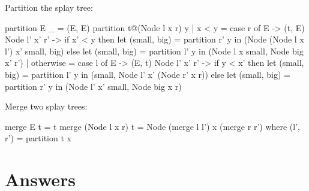 \documentclass[b5paper]{article}
\begin{document}
Partition the splay tree:

\begin{Haskell}
partition E _ = (E, E)
partition t@(Node l x r) y
    | x < y =
        case r of
          E -> (t, E)
          Node l' x' r' ->
              if x' < y then
                  let (small, big) = partition r' y in
                  (Node (Node l x l') x' small, big)
              else
                  let (small, big) = partition l' y in
                  (Node l x small, Node big x' r')
    | otherwise =
        case l of
          E -> (E, t)
          Node l' x' r' ->
              if y < x' then
                  let (small, big) = partition l' y in
                  (small, Node l' x' (Node r' x r))
              else
                  let (small, big) = partition r' y in
                  (Node l' x' small, Node big x r)
\end{Haskell}

Merge two splay trees:

\begin{Haskell}
merge E t = t
merge (Node l x r) t = Node (merge l l') x (merge r r')
    where (l', r') = partition t x
\end{Haskell}

\ifx\wholebook\relax \else
\section{Answers}
\shipoutAnswer
\end{document}
